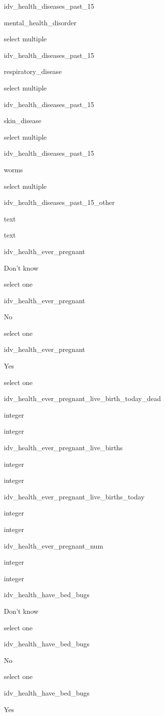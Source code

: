 \documentclass[]{article}
\begin{document}
idv\_health\_diseases\_past\_15

mental\_health\_disorder

select multiple

idv\_health\_diseases\_past\_15

respiratory\_disease

select multiple

idv\_health\_diseases\_past\_15

skin\_disease

select multiple

idv\_health\_diseases\_past\_15

worms

select multiple

idv\_health\_diseases\_past\_15\_other

text

text

idv\_health\_ever\_pregnant

Don't know

select one

idv\_health\_ever\_pregnant

No

select one

idv\_health\_ever\_pregnant

Yes

select one

idv\_health\_ever\_pregnant\_live\_birth\_today\_dead

integer

integer

idv\_health\_ever\_pregnant\_live\_births

integer

integer

idv\_health\_ever\_pregnant\_live\_births\_today

integer

integer

idv\_health\_ever\_pregnant\_num

integer

integer

idv\_health\_have\_bed\_bugs

Don't know

select one

idv\_health\_have\_bed\_bugs

No

select one

idv\_health\_have\_bed\_bugs

Yes
\end{document}
